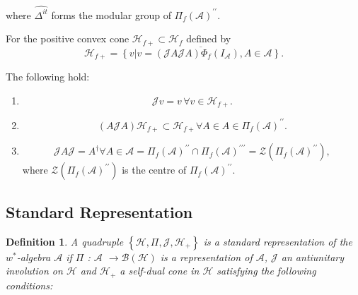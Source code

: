 \documentclass[aps,preprint]{revtex4}%
\newtheorem{definition}[theorem]{Definition}
\begin{document}
where $\widehat{\Delta^{it}}$ forms the modular group of $\Pi_{f}\left(
\mathcal{A}\right)  ^{\prime\prime}.$

For the positive convex cone $\mathcal{H}_{f+}\subset\mathcal{H}_{f}$ defined
by
\begin{equation}
\mathcal{H}_{f+}=\overline{\left\{  \left.  v\right\vert v=\left(
\mathcal{J}A\mathcal{J}A\right)  \Phi_{f}\left(  I_{\mathcal{A}}\right)
,A\in\mathcal{A}\right\}  }.
\end{equation}


The following hold:

\begin{enumerate}
\item
\begin{equation}
\mathcal{J}v=v\,\forall v\in\mathcal{H}_{f+}.
\end{equation}


\item
\begin{equation}
\left(  A\mathcal{J}A\right)  \mathcal{H}_{f+}\subset\mathcal{H}_{f+}\forall
A\in A\in\Pi_{f}\left(  \mathcal{A}\right)  ^{\prime\prime}.
\end{equation}


\item
\begin{equation}
\mathcal{J}A\mathcal{J}=A^{\dagger}\forall A\in\mathcal{A}=\Pi_{f}\left(
\mathcal{A}\right)  ^{\prime\prime}\cap\Pi_{f}\left(  \mathcal{A}\right)
^{\prime\prime\prime}=\mathcal{Z}\left(  \Pi_{f}\left(  \mathcal{A}\right)
^{\prime\prime}\right)  ,
\end{equation}
where $\mathcal{Z}\left(  \Pi_{f}\left(  \mathcal{A}\right)  ^{\prime\prime
}\right)  $ is the centre of $\Pi_{f}\left(  \mathcal{A}\right)
^{\prime\prime}.$
\end{enumerate}

\subsection{Standard Representation}

\begin{definition}
A quadruple $\left\{  \mathcal{H},\Pi,\mathcal{J},\mathcal{H}_{+}\right\}  $
is a standard representation of the $w^{\ast}$-algebra $\mathcal{A}$ if $\Pi$
: $\mathcal{A}$ $\rightarrow\mathcal{B}(\mathcal{H})$ is a representation of
$\mathcal{A}$, $\mathcal{J}$ an antiunitary involution on $\mathcal{H}$ and
$\mathcal{H}_{+}$ a self-dual cone in $\mathcal{H}$ satisfying the following conditions:
\end{definition}
\end{document}
